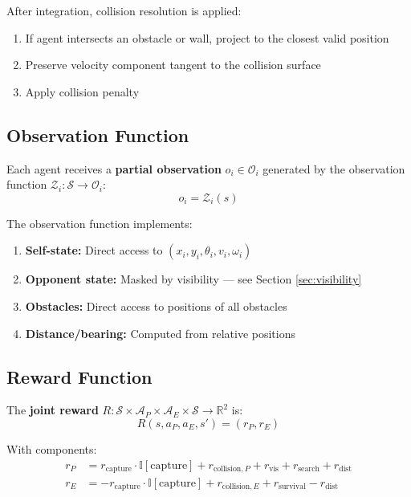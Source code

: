 \documentclass[11pt,a4paper]{report}
\begin{document}
After integration, collision resolution is applied:
\begin{enumerate}
    \item If agent intersects an obstacle or wall, project to the closest valid position
    \item Preserve velocity component tangent to the collision surface
    \item Apply collision penalty
\end{enumerate}

\subsection{Observation Function}

Each agent receives a \textbf{partial observation} $o_i \in \mathcal{O}_i$ generated by the observation function $\mathcal{Z}_i: \mathcal{S} \to \mathcal{O}_i$:
\begin{equation}
    o_i = \mathcal{Z}_i(s)
\end{equation}

The observation function implements:
\begin{enumerate}
    \item \textbf{Self-state:} Direct access to $(x_i, y_i, \theta_i, v_i, \omega_i)$
    \item \textbf{Opponent state:} Masked by visibility --- see Section \ref{sec:visibility}
    \item \textbf{Obstacles:} Direct access to positions of all obstacles
    \item \textbf{Distance/bearing:} Computed from relative positions
\end{enumerate}

\subsection{Reward Function}

The \textbf{joint reward} $R: \mathcal{S} \times \mathcal{A}_P \times \mathcal{A}_E \times \mathcal{S} \to \mathbb{R}^2$ is:
\begin{equation}
    R(s, a_P, a_E, s') = (r_P, r_E)
\end{equation}

With components:
\begin{align}
    r_P &= r_{\text{capture}} \cdot \mathbb{I}[\text{capture}] + r_{\text{collision},P} + r_{\text{vis}} + r_{\text{search}} + r_{\text{dist}} \\
    r_E &= -r_{\text{capture}} \cdot \mathbb{I}[\text{capture}] + r_{\text{collision},E} + r_{\text{survival}} - r_{\text{dist}}
\end{align}
\end{document}
